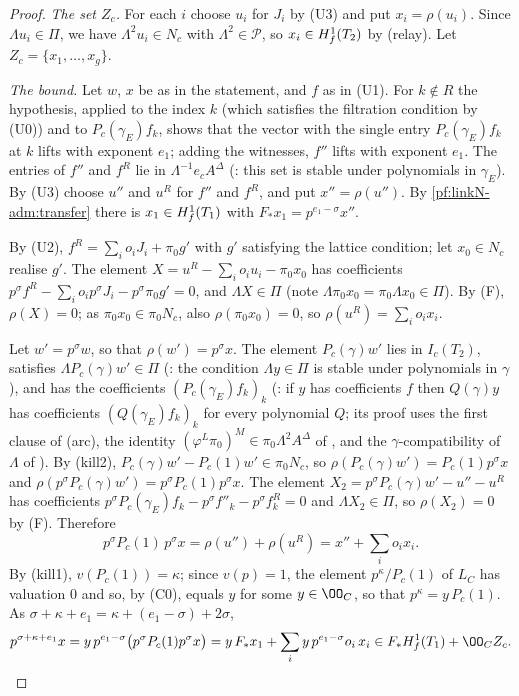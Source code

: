 \begin{proof}
\emph{The set $Z_c$.} For each $i$ choose $u_i$ for $J_i$ by (U3) and put $x_i=\rho(u_i)$. Since $\Lambda u_i\in\Pi$, we have
$\Lambda^2u_i\in N_c$ with $\Lambda^2\in\mathcal P$, so $x_i\in H^1_{f}(T_2)$ by (relay). Let $Z_c=\{x_1,\dots,x_g\}$.

\emph{The bound.} Let $w$, $x$ be as in the statement, and $f$ as in (U1). For $k\notin R$ the hypothesis, applied to the
index $k$ (which satisfies the filtration condition by (U0)) and to $P_c(\gamma_E)f_k$, shows that the vector with the
single entry $P_c(\gamma_E)f_k$ at $k$ lifts with exponent $e_1$; adding the witnesses, $f''$ lifts with exponent $e_1$. The
entries of $f''$ and $f^R$ lie in $\Lambda^{-1}e_cA^\Delta$
(: this set is stable under polynomials in $\gamma_E$). By
(U3) choose $u''$ and $u^R$ for $f''$ and $f^R$, and put $x''=\rho(u'')$. By \cref{pf:linkN-adm:transfer} there is
$x_1\in H^1_{f}(T_1)$ with $F_*x_1=p^{e_1-\sigma}x''$.

By (U2), $f^R=\sum_io_iJ_i+\pi_0g'$ with $g'$ satisfying the lattice condition; let $x_0\in N_c$ realise $g'$. The element
$X=u^R-\sum_io_iu_i-\pi_0x_0$ has coefficients $p^\sigma f^R-\sum_io_ip^\sigma J_i-p^\sigma\pi_0g'=0$, and $\Lambda X\in\Pi$
(note $\Lambda\pi_0x_0=\pi_0\Lambda x_0\in\Pi$). By (F), $\rho(X)=0$; as $\pi_0x_0\in\pi_0N_c$, also $\rho(\pi_0x_0)=0$, so
$\rho(u^R)=\sum_io_ix_i$.

Let $w'=p^\sigma w$, so that $\rho(w')=p^\sigma x$. The element $P_c(\gamma)w'$ lies in $I_c(T_2)$, satisfies
$\Lambda P_c(\gamma)w'\in\Pi$ (: the condition $\Lambda y\in\Pi$
is stable under polynomials in $\gamma$), and has the coefficients $(P_c(\gamma_E)f_k)_k$
(: if $y$ has coefficients $f$ then $Q(\gamma)y$ has
coefficients $(Q(\gamma_E)f_k)_k$ for every polynomial $Q$; its proof uses the first clause of (arc), the identity
$(\varphi^L\pi_0)^M\in\pi_0\Lambda^2A^\Delta$ of , and the
$\gamma$-compatibility of $\Lambda$ of ). By (kill2),
$P_c(\gamma)w'-P_c(1)w'\in\pi_0N_c$, so $\rho(P_c(\gamma)w')=P_c(1)p^\sigma x$ and $\rho(p^\sigma P_c(\gamma)w')=
p^\sigma P_c(1)p^\sigma x$. The element $X_2=p^\sigma P_c(\gamma)w'-u''-u^R$ has coefficients
$p^\sigma P_c(\gamma_E)f_k-p^\sigma f''_k-p^\sigma f^R_k=0$ and $\Lambda X_2\in\Pi$, so $\rho(X_2)=0$ by (F). Therefore
\[
p^\sigma P_c(1)\,p^\sigma x=\rho(u'')+\rho(u^R)=x''+\sum_io_ix_i .
\]
By (kill1), $v(P_c(1))=\kappa$; since $v(p)=1$, the element $p^\kappa/P_c(1)$ of $L_C$ has valuation $0$ and so, by (C0),
equals $y$ for some $y\in\OO_C$, so that $p^\kappa=y\,P_c(1)$. As
$\sigma+\kappa+e_1=\kappa+(e_1-\sigma)+2\sigma$,
\[
p^{\sigma+\kappa+e_1}x=y\,p^{e_1-\sigma}\bigl(p^\sigma P_c(1)p^\sigma x\bigr)=y\,F_*x_1+\sum_iy\,p^{e_1-\sigma}o_i\,x_i
\in F_*\linkNadmHf(T_1)+\OO_CZ_c .\qedhere
\]
\end{proof}

